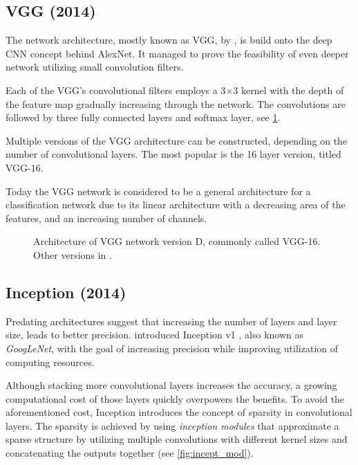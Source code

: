 \subsection{VGG (2014)}
\label{sec:VGG}
The network architecture, mostly known as VGG, by \citeauthor{bib:vgg} \cite{bib:vgg}, is build onto the deep CNN concept behind AlexNet. It managed to prove the feasibility of even deeper network utilizing small convolution filters. 

Each of the VGG's convolutional filters employs a 3$\times$3 kernel with the depth of the feature map gradually increasing through the network. The convolutions are followed by three fully connected layers and softmax layer, see \cref{tab:vggarch}. 

Multiple versions of the VGG architecture can be constructed, depending on the number of convolutional layers. The most popular is the 16 layer version, titled VGG-16.

Today the VGG network is considered to be a general architecture for a classification network due to its linear architecture with a decreasing area of the features, and an increasing number of channels. 

\begin{figure}
    \centering
    \caption[VGG-16 architecture]%
    {Architecture of VGG network version D, commonly called VGG-16. Other versions in \cite[table 1]{bib:vgg}.}
    \label{tab:vggarch}
\end{figure}

\subsection{Inception (2014)}
\label{sec:inception}
Predating architectures suggest that increasing the number of layers and layer size, leads to better precision. \citeauthor{bib:googlenet} introduced Inception v1 \cite{bib:googlenet}, also known as \textit{GoogLeNet}, with the goal of increasing precision while improving utilization of computing resources.

Although stacking more convolutional layers increases the accuracy, a growing computational cost of those layers quickly overpowers the benefits. To avoid the aforementioned cost, Inception introduces the concept of sparsity in convolutional layers. The sparsity is achieved by using \textit{inception modules} that approximate a sparse structure by utilizing multiple convolutions with different kernel sizes and concatenating the outputs together (see \cref{fig:incept_mod}). 

